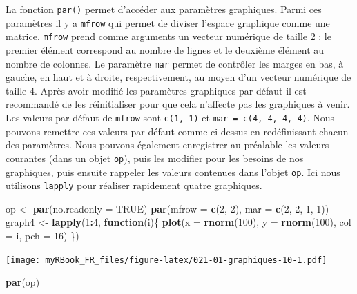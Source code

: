 \documentclass[]{book}
\newenvironment{Shaded}{\begin{snugshade}}{\end{snugshade}}
\newcommand{\ControlFlowTok}[1]{\textcolor[rgb]{0.13,0.29,0.53}{\textbf{#1}}}
\newcommand{\DataTypeTok}[1]{\textcolor[rgb]{0.13,0.29,0.53}{#1}}
\newcommand{\DecValTok}[1]{\textcolor[rgb]{0.00,0.00,0.81}{#1}}
\newcommand{\KeywordTok}[1]{\textcolor[rgb]{0.13,0.29,0.53}{\textbf{#1}}}
\newcommand{\NormalTok}[1]{#1}
\newcommand{\OperatorTok}[1]{\textcolor[rgb]{0.81,0.36,0.00}{\textbf{#1}}}
\newcommand{\OtherTok}[1]{\textcolor[rgb]{0.56,0.35,0.01}{#1}}
\newcommand{\StringTok}[1]{\textcolor[rgb]{0.31,0.60,0.02}{#1}}
\begin{document}
La fonction \texttt{par()} permet d'accéder aux paramètres graphiques. Parmi ces paramètres il y a \texttt{mfrow} qui permet de diviser l'espace graphique comme une matrice. \texttt{mfrow} prend comme arguments un vecteur numérique de taille 2 : le premier élément correspond au nombre de lignes et le deuxième élément au nombre de colonnes. Le paramètre \texttt{mar} permet de contrôler les marges en bas, à gauche, en haut et à droite, respectivement, au moyen d'un vecteur numérique de taille 4. Après avoir modifié les paramètres graphiques par défaut il est recommandé de les réinitialiser pour que cela n'affecte pas les graphiques à venir. Les valeurs par défaut de \texttt{mfrow} sont \texttt{c(1,\ 1)} et \texttt{mar\ =\ c(4,\ 4,\ 4,\ 4)}. Nous pouvons remettre ces valeurs par défaut comme ci-dessus en redéfinissant chacun des paramètres. Nous pouvons également enregistrer au préalable les valeurs courantes (dans un objet \texttt{op}), puis les modifier pour les besoins de nos graphiques, puis ensuite rappeler les valeurs contenues dans l'objet \texttt{op}. Ici nous utilisons \texttt{lapply} pour réaliser rapidement quatre graphiques.

\begin{Shaded}
\begin{Highlighting}[]
\NormalTok{op <-}\StringTok{ }\KeywordTok{par}\NormalTok{(}\DataTypeTok{no.readonly =} \OtherTok{TRUE}\NormalTok{)}
\KeywordTok{par}\NormalTok{(}\DataTypeTok{mfrow =} \KeywordTok{c}\NormalTok{(}\DecValTok{2}\NormalTok{, }\DecValTok{2}\NormalTok{), }\DataTypeTok{mar =} \KeywordTok{c}\NormalTok{(}\DecValTok{2}\NormalTok{, }\DecValTok{2}\NormalTok{, }\DecValTok{1}\NormalTok{, }\DecValTok{1}\NormalTok{))}
\NormalTok{graph4 <-}\StringTok{ }\KeywordTok{lapply}\NormalTok{(}\DecValTok{1}\OperatorTok{:}\DecValTok{4}\NormalTok{, }\ControlFlowTok{function}\NormalTok{(i)\{}
  \KeywordTok{plot}\NormalTok{(}\DataTypeTok{x =} \KeywordTok{rnorm}\NormalTok{(}\DecValTok{100}\NormalTok{), }
    \DataTypeTok{y =} \KeywordTok{rnorm}\NormalTok{(}\DecValTok{100}\NormalTok{), }
    \DataTypeTok{col =}\NormalTok{ i, }\DataTypeTok{pch =} \DecValTok{16}\NormalTok{)}
\NormalTok{\})}
\end{Highlighting}
\end{Shaded}

\texttt{[image: myRBook\_FR\_files/figure-latex/021-01-graphiques-10-1.pdf]}

\begin{Shaded}
\begin{Highlighting}[]
\KeywordTok{par}\NormalTok{(op)}
\end{Highlighting}
\end{Shaded}
\end{document}
